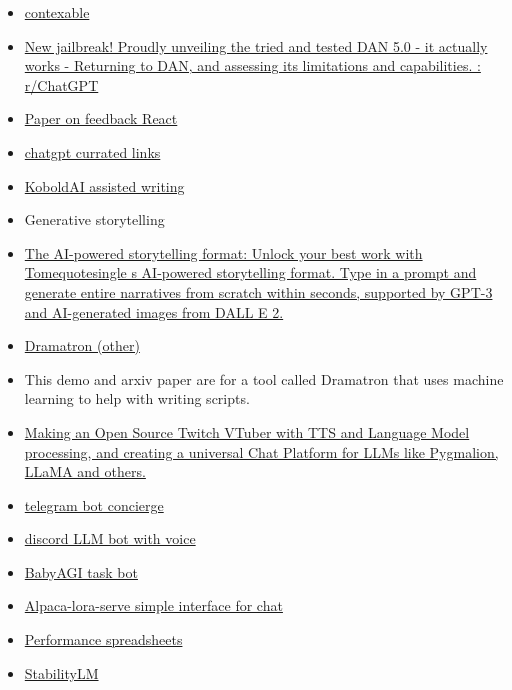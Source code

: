 \begin{itemize}
\begin{itemize}
  \item
    \href{https://www.contextable.ai/}{contexable}
  \item
    \href{https://www.reddit.com/r/ChatGPT/comments/10tevu1/new_jailbreak_proudly_unveiling_the_tried_and/}{New
    jailbreak! Proudly unveiling the tried and tested DAN 5.0 - it
    actually works - Returning to DAN, and assessing its limitations and
    capabilities. : r/ChatGPT}
  \item
    \href{https://arxiv.org/abs/2210.03629}{Paper on feedback React}
  \item
    \href{https://github.com/OpenMindClub/awesome-chatgpt}{chatgpt
    currated links}
  \item
    \href{https://github.com/KoboldAI/KoboldAI-Client}{KoboldAI assisted
    writing}
  \item
    Generative storytelling
  \item
    \href{https://beta.tome.app/}{The AI-powered storytelling format:
    Unlock your best work with Tomequotesingle s AI-powered
    storytelling format. Type in a prompt and generate entire narratives
    from scratch within seconds, supported by GPT-3 and AI-generated
    images from DALL E 2.}
  \item
    \href{https://deepmind.github.io/dramatron/}{Dramatron (other)}
  \item
    This demo and arxiv paper are for a tool called Dramatron that uses
    machine learning to help with writing scripts.
  \item
    \href{https://github.com/Project-Akiko}{Making an Open Source Twitch
    VTuber with TTS and Language Model processing, and creating a
    universal Chat Platform for LLMs like Pygmalion, LLaMA and others.}
  \item
    \href{https://github.com/RafalWilinski/telegram-chatgpt-concierge-bot}{telegram
    bot concierge}
  \item
    \href{https://github.com/hc20k/LLMChat}{discord LLM bot with voice}
  \item
    \href{https://github.com/yoheinakajima/babyagi}{BabyAGI task bot}
  \item
    \href{https://github.com/deep-diver/LLM-As-Chatbot}{Alpaca-lora-serve
    simple interface for chat}
  \item
    \href{https://docs.google.com/spreadsheets/d/1UsbivogLMrQbBA-Fk0ESRGTrvCsknBUieSykfWn6D9Q/edit\#gid=0}{Performance
    spreadsheets}
  \item
    \href{https://huggingface.co/stabilityai/stablelm-tuned-alpha-7b}{StabilityLM
}
\end{itemize}
\end{itemize}
